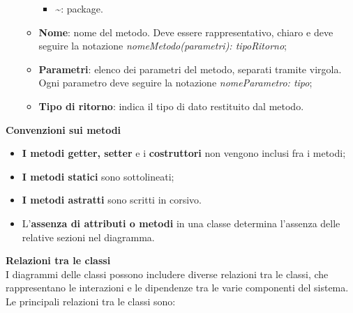 \begin{enumerate}
\begin{itemize}
\begin{itemize}
			\item \textbf{\textasciitilde}: package.
		\end{itemize}
		\item \textbf{Nome}: nome del metodo. Deve essere rappresentativo, chiaro e deve seguire la notazione \textit{nomeMetodo(parametri): tipoRitorno};
		\item \textbf{Parametri}: elenco dei parametri del metodo, separati tramite virgola. Ogni parametro deve seguire la notazione \textit{nomeParametro: tipo};
		\item \textbf{Tipo di ritorno}: indica il tipo di dato restituito dal metodo.
	\end{itemize}
\end{enumerate}

\textbf{Convenzioni sui metodi}
\begin{itemize}
	\item \textbf{I metodi getter, setter} e i \textbf{costruttori} non vengono inclusi fra i metodi;
	\item \textbf{I metodi statici} sono sottolineati;
	\item \textbf{I metodi astratti} sono scritti in corsivo.
	\item L'\textbf{assenza di attributi o metodi} in una classe determina l'assenza delle relative sezioni nel diagramma.
\end{itemize}
\newpage
\textbf{Relazioni tra le classi}\\
I diagrammi delle classi possono includere diverse relazioni tra le classi, che rappresentano le interazioni e le dipendenze tra le varie componenti del sistema. Le principali relazioni tra le classi sono:

